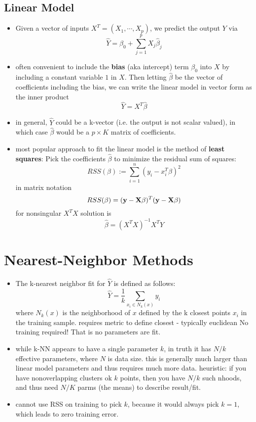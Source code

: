 \documentclass[a4paper]{report}
\begin{document}
\subsection{Linear Model}
\begin{itemize}
  \item Given a vector of inputs $X^T = (X_1, \cdots, X_p)$, we predict the output $Y$ via
    $$ \hat{Y}  = \beta_0 + \sum_{j=1}^p X_j \hat{\beta}_j $$
  \item often convenient to include the {\bf bias} (aka intercept) term $\beta_0$  into $X$ by including a constant variable $1$ in $X$. Then letting $\hat{\beta}$ be the vector of coefficients including the bias, we can write the linear model in vector form as the inner product
    $$ \hat{Y} = X^T\hat{\beta} $$
  \item in general, $\hat{Y}$ could be a k-vector (i.e. the output is not scalar valued), in which case $\hat{\beta}$ would be a $p\times K$ matrix of coefficients.
  \item most popular approach to fit the linear model is the method of {\bf least squares}: Pick the coefficients $\hat{\beta}$ to minimize the residual sum of squares:
    $$ RSS(\beta) := \sum_{i=1}^n (y_i - x_i^T\beta)^2$$
    in matrix notation
    $$ RSS(\beta) = ({\bf y} - {\bf X}\beta)^T({\bf y} - {\bf X}\beta) $$
    \subitem for nonsingular $X^TX$ solution is
    $$ \hat{\beta} = \left(X^TX\right)^{-1} X^TY $$
\end{itemize}

\section{Nearest-Neighbor Methods}
\begin{itemize}
  \item The k-nearest neighbor fit for $\hat{Y}$ is defined as follows:
    $$ \hat{Y} = \frac{1}{k} \sum_{x_i \in N_k(x)} y_i $$
    where $N_k(x)$ is the neighborhood of $x$ defined by the k closest points $x_i$ in the training sample.
    \subitem requires metric to define closest - typically euclidean
    \subitem No training required! That is no parameters are fit.
  \item while k-NN appears to have a single parameter $k$, in truth it has $N/k$ effective parameters, where $N$ is data size.
    \subitem this is generally much larger than linear model parameters and thus requires much more data.
    \subitem heuristic: if you have nonoverlapping clusters ok $k$ points, then you have $N/k$ such nhoods, and thus need $N/K$ parms (the means) to describe result/fit.
  \item cannot use RSS on training to pick $k$, because it would always pick $k=1$, which leads to zero training error.
\end{itemize}
\end{document}
